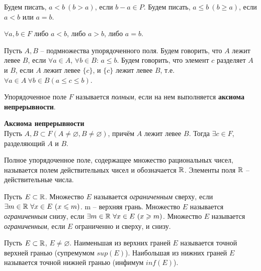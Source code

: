     Будем писать, $a < b \ (b > a)$, если $b - a \in P$. Будем писать, $a \leq b \ (b \geq a)$, если $a < b$ или $a = b$.

    \begin{note}
        $\forall a,b \in F$ либо $a < b$, либо $a > b$, либо $a = b$.
    \end{note}

    \begin{definition}
        Пусть $A, B$ -- подмножества упорядоченного поля. Будем говорить, что $A$ лежит левее $B$, если $\forall a \in A$, $\forall b \in B$: $a \leq b$. Будем говорить, что элемент $c$ разделяет $A$ и $B$, если $A$ лежит левее $\{c\}$, и $\{c\}$ лежит левее $B$, т.е. $\forall a \in A \ \forall b \in B (a \leq c \leq b)$. 
    \end{definition}
    
    \begin{definition}
        Упорядоченное поле $F$ называется \textit{полным}, если на нем выполняется \textbf{аксиома непрерывности}.
    \end{definition}

    \begin{theorem}{\textbf{Аксиома непрерывности}}\\
        Пусть $A, B \subset F (A \neq \varnothing, B \neq \varnothing)$, причём $A$ лежит левее $B$. Тогда $\exists c \in F$, разделяющий $A$ и $B$.
    \end{theorem}

    \begin{definition}
        Полное упорядоченное поле, содержащее множество рациональных чисел, называется полем действительных чисел и обозначается $\mathbb{R}$. Элементы поля $\mathbb{R}$ -- действительные числа.
    \end{definition}
    
    \begin{definition}
        Пусть $E \subset \mathbb{R}$. Множество $E$ называется \textit{ограниченным} сверху, если $\exists m \in \mathbb{R} \  \forall x \in E \ (x \leqslant m)$. m -- верхняя грань.
        Множество $E$ называется \textit{ограниченным} снизу, если $\exists m \in \mathbb{R} \  \forall x \in E \ (x \geqslant m)$.
        Множество $E$ называется \textit{ограниченным}, если $E$ ограниченно и сверху, и снизу.
    \end{definition}
    
    \begin{definition}
        Пусть $E \subset \mathbb{R}$, $E \neq \varnothing$.  Наименьшая из верхних граней $E$ называется точной верхней гранью (супремумом $sup(E)$). Наибольшая из нижних граней $E$ называется точной нижней гранью (инфимум $inf(E)$). 
    \end{definition}
    
